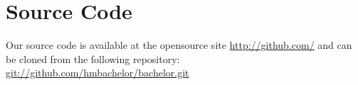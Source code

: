 \chapter{Source Code}

Our source code is available at the opensource site
\href{http://github.com/}{http://github.com/} and can be cloned from
the following repository:
\href{git://github.com/hmbachelor/bachelor.git}{git://github.com/hmbachelor/bachelor.git}









